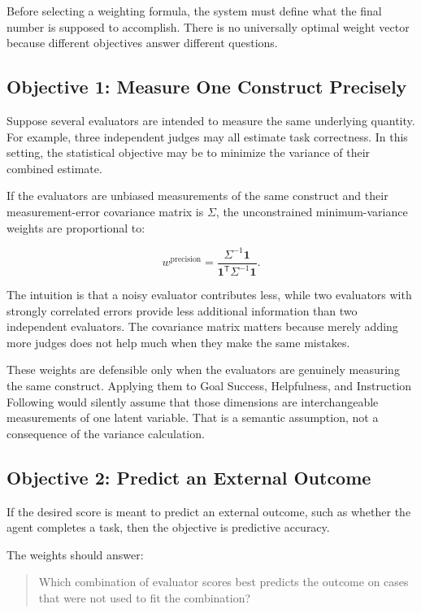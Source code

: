 \documentclass[11pt]{article}
\begin{document}
Before selecting a weighting formula, the system must define what the final
number is supposed to accomplish. There is no universally optimal weight
vector because different objectives answer different questions.

\subsection{Objective 1: Measure One Construct Precisely}

Suppose several evaluators are intended to measure the same underlying
quantity. For example, three independent judges may all estimate task
correctness. In this setting, the statistical objective may be to minimize the
variance of their combined estimate.

If the evaluators are unbiased measurements of the same construct and their
measurement-error covariance matrix is \(\Sigma\), the unconstrained
minimum-variance weights are proportional to:

\begin{equation}
w^{\mathrm{precision}}
=
\frac{\Sigma^{-1}\mathbf{1}}
     {\mathbf{1}^{\mathsf{T}}\Sigma^{-1}\mathbf{1}}.
\end{equation}

The intuition is that a noisy evaluator contributes less, while two evaluators
with strongly correlated errors provide less additional information than two
independent evaluators. The covariance matrix matters because merely adding
more judges does not help much when they make the same mistakes.

These weights are defensible only when the evaluators are genuinely measuring
the same construct. Applying them to Goal Success, Helpfulness, and
Instruction Following would silently assume that those dimensions are
interchangeable measurements of one latent variable. That is a semantic
assumption, not a consequence of the variance calculation.

\subsection{Objective 2: Predict an External Outcome}

If the desired score is meant to predict an external outcome, such as whether
the agent completes a task, then the objective is predictive accuracy.

The weights should answer:

\begin{quote}
Which combination of evaluator scores best predicts the outcome on cases that
were not used to fit the combination?
\end{quote}
\end{document}
